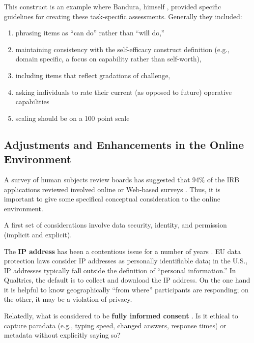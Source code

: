\documentclass[
  english,
]{book}
\providecommand{\tightlist}{%
  \setlength{\itemsep}{0pt}\setlength{\parskip}{0pt}}
\begin{document}
This construct is an example where Bandura, himself \citeyearpar{bandura_guide_2006}, provided specific guidelines for creating these task-specific assessments. Generally they included:

\begin{enumerate}
\def\labelenumi{\arabic{enumi}.}
\tightlist
\item
  phrasing items as ``can do'' rather than ``will do,''
\item
  maintaining consistency with the self-efficacy construct definition (e.g., domain specific, a focus on capability rather than self-worth),
\item
  including items that reflect gradations of challenge,
\item
  asking individuals to rate their current (as opposed to future) operative capabilities
\item
  scaling should be on a 100 point scale
\end{enumerate}

\hypertarget{adjustments-and-enhancements-in-the-online-environment}{%
\subsection{Adjustments and Enhancements in the Online Environment}\label{adjustments-and-enhancements-in-the-online-environment}}

A survey of human subjects review boards has suggested that 94\% of the IRB applications reviewed involved online or Web-based surveys \citep{buchanan_online_2009}. Thus, it is important to give some specifical conceptual consideration to the online environment.

A first set of considerations involve data security, identity, and permission (implicit and explicit).

The \textbf{IP address} has been a contentious issue for a number of years \citep{buchanan_online_2009}. EU data protection laws consider IP addresses as personally identifiable data; in the U.S., IP addresses typically fall outside the definition of ``personal information.'' In Qualtrics, the default is to collect and download the IP address. On the one hand it is helpful to know geographically ``from where'' participants are responding; on the other, it may be a violation of privacy.

Relatedly, what is considered to be \textbf{fully informed consent} \citep{conrad_survey_2007}. Is it ethical to capture paradata (e.g., typing speed, changed answers, response times) or metadata without explicitly saying so?
\end{document}
